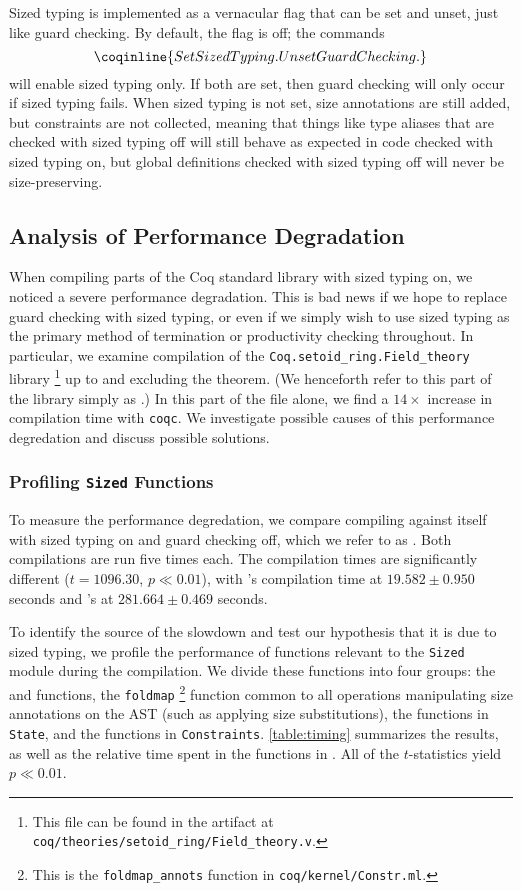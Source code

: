 Sized typing is implemented as a vernacular flag that can be set and unset, just like guard checking.
By default, the flag is off; the commands
$$\coqinline{Set Sized Typing. Unset Guard Checking.}$$
will enable sized typing only.
If both are set, then guard checking will only occur if sized typing fails.
When sized typing is not set, size annotations are still added, but constraints are not collected,
meaning that things like type aliases that are checked with sized typing off will still behave as expected in code checked with sized typing on,
but global definitions checked with sized typing off will never be size-preserving.

\subsection{Analysis of Performance Degradation}

When compiling parts of the Coq standard library with sized typing on, we noticed a severe performance degradation.
This is bad news if we hope to replace guard checking with sized typing,
or even if we simply wish to use sized typing as the primary method of termination or productivity checking throughout.
In particular, we examine compilation of the \texttt{Coq.setoid\_ring.Field\_theory} library%
\footnote{This file can be found in the artifact at \texttt{coq/theories/setoid\_ring/Field\_theory.v}.}
up to and excluding the \fnormeval theorem.
(We henceforth refer to this part of the library simply as \fieldtheory.)
In this part of the file alone, we find a $14\times$ increase in compilation time with \texttt{coqc}.
We investigate possible causes of this performance degredation and discuss possible solutions.

\subsubsection{Profiling \texttt{Sized} Functions}

To measure the performance degredation, we compare compiling \fieldtheory against itself with sized typing on and guard checking off, which we refer to as \fieldtheorysized.
Both compilations are run five times each.
The compilation times are significantly different ($t = 1096.30$, $p \ll 0.01$),
with \fieldtheory's compilation time at $19.582 \pm 0.950$ seconds and \fieldtheorysized's at $281.664 \pm 0.469$ seconds.

To identify the source of the slowdown and test our hypothesis that it is due to sized typing,
we profile the performance of functions relevant to the \texttt{Sized} module during the compilation.
We divide these functions into four groups: the \solve and \RecCheck functions, the \texttt{foldmap}%
\footnote{This is the \texttt{foldmap\_annots} function in \texttt{coq/kernel/Constr.ml}.}
function common to all operations manipulating size annotations on the AST (such as applying size substitutions),
the functions in \texttt{State}, and the functions in \texttt{Constraints}.
\autoref{table:timing} summarizes the results, as well as the relative time spent in the functions in \fieldtheorysized.
All of the $t$-statistics yield $p \ll 0.01$.

